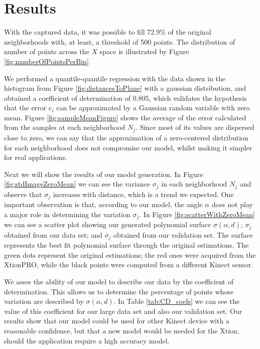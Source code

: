 \section{Results} \label{sec:results} 

With the captured data, it was possible to fill 72.9\% of the original
neighborhoods with, at least, a threshold of 500 points. The distribution of
number of points across the $X$ space is illustrated by Figure
\ref{fig:numberOfPointsPerBin}.

We performed a quantile-quantile regression with the data shown in the
histogram from Figure \ref{fig:distancesToPlane} with a gaussian distribution,
and obtained a coefficient of determination of 0.805, which validates the
hypothesis that the error $e_i$ can be approximated by a Gaussian random
variable with zero mean.  Figure \ref{fig:sampleMeanFigure} shows the average
of the error calculated from the samples at each neighborhood $N_j$. Since most
of its values are dispersed close to zero, we can say that the approximation of
a zero-centered distribution for each neighborhood does not compromise our
model, whilst making it simpler for real applications.

Next we will show the results of our model generation. In Figure \ref{fig:stdImageZeroMean} we can see
the variance $\sigma_j$ in each neighborhood $N_j$ and observe that $\sigma_j$
increases with distance, which is a trend we expected. One important
observation is that, according to our model, the angle $\alpha$ does not play a
major role in determining the variation $\sigma_j$.  In Figure \ref{fig:scatterWithZeroMean} we can see a
scatter plot showing our generated polynomial surface $\sigma(\alpha,d)$;
$\sigma_j$ obtained from our data set; and $\sigma_j$ obtained from our
validation set. The surface represents the best fit polynomial surface through
the original estimations. The green dots represent the original estimations;
the red ones were acquired from the XtionPRO, while the black points were
computed from a different Kinect sensor.

We asses the ability of our model to describe our data by the coefficient of
determination. This allows us to determine the percentage of points whose
variation are described by $\sigma(\alpha,d)$. In Table \ref{tab:CD_coefs} we
can see the value of this coefficient for our large data set and also our
validation set. Our results show that our model could be used for other
Kinect device with a reasonable confidence, but that a new model would be needed
for the Xtion, should the application require a high accuracy model. 

